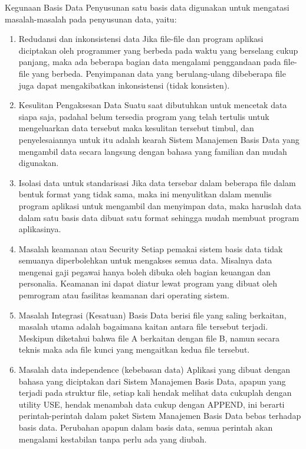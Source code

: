 Kegunaan Basis Data Penyusunan satu basis data digunakan untuk mengatasi masalah-masalah pada penyusunan data, yaitu: 
\begin{enumerate}
\item Redudansi dan inkonsistensi data Jika file-file dan program aplikasi diciptakan oleh programmer yang berbeda pada waktu yang berselang cukup panjang, maka ada beberapa bagian data mengalami penggandaan pada file-file yang berbeda. Penyimpanan data yang berulang-ulang dibeberapa file juga dapat mengakibatkan inkonsistensi (tidak konsisten). 
\item Kesulitan Pengaksesan Data  Suatu saat dibutuhkan untuk mencetak data siapa saja, padahal belum tersedia program yang telah tertulis untuk mengeluarkan data tersebut maka kesulitan tersebut timbul, dan penyelesaiannya untuk itu adalah kearah Sistem Manajemen Basis Data yang mengambil data secara langsung dengan bahasa yang familian dan mudah digunakan.
\item Isolasi data untuk standarisasi  Jika data tersebar dalam beberapa file dalam bentuk format yang tidak sama, maka ini menyulitkan dalam menulis program aplikasi untuk mengambil dan menyimpan data, maka haruslah data dalam satu basis data dibuat satu format sehingga mudah membuat program aplikasinya.
\item Masalah keamanan atau Security  Setiap pemakai sistem basis data tidak semuanya diperbolehkan untuk mengakses semua data. Misalnya data mengenai gaji pegawai hanya boleh dibuka oleh bagian keuangan dan personalia. Keamanan ini dapat diatur lewat program yang dibuat oleh pemrogram atau fasilitas keamanan dari operating sistem.
\item Masalah Integrasi (Kesatuan) Basis Data berisi file yang saling berkaitan, masalah utama adalah bagaimana kaitan antara file tersebut terjadi. Meskipun diketahui bahwa file A berkaitan dengan file B, namun secara teknis maka ada file kunci yang mengaitkan kedua file tersebut.
\item Masalah data independence (kebebasan data) Aplikasi yang dibuat dengan bahasa yang diciptakan dari Sistem Manajemen Basis Data, apapun yang terjadi pada struktur file, setiap kali hendak melihat data cukuplah dengan utility USE, hendak menambah data cukup dengan APPEND, ini berarti perintah-perintah dalam paket Sistem Manajemen Basis Data bebas terhadap basis data. Perubahan apapun dalam basis data, semua perintah akan mengalami kestabilan tanpa perlu ada yang diubah.
\end{enumerate}

